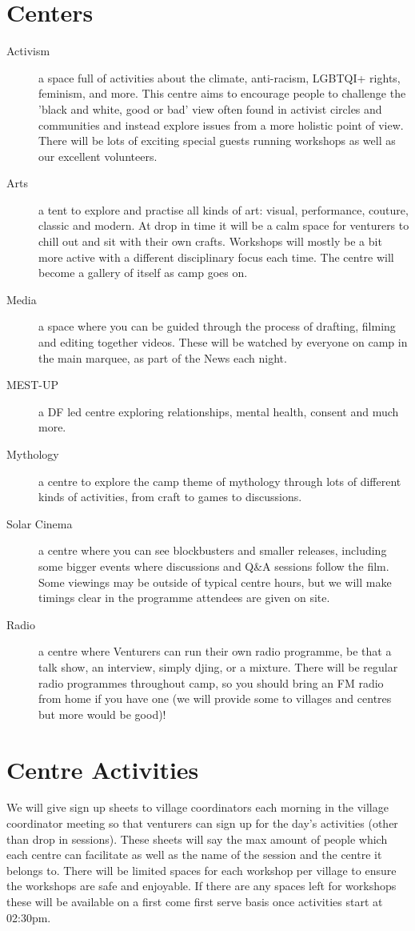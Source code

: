 \documentclass[a4paper, 11pt]{report}
\begin{document}
\section{Centers}
\begin{description}
    \item[Activism] a space full of activities about the climate, anti-racism, LGBTQI+ rights, feminism, and more. This centre aims to encourage people to challenge the 'black and white, good or bad' view often found in activist circles and communities and instead explore issues from a more holistic point of view. There will be lots of exciting special guests running workshops as well as our excellent volunteers.
    \item[Arts] a tent to explore and practise all kinds of art: visual, performance, couture, classic and modern. At drop in time it will be a calm space for venturers to chill out and sit with their own crafts. Workshops will mostly be a bit more active with a different disciplinary focus each time. The centre will become a gallery of itself as camp goes on.
    \item[Media] a space where you can be guided through the process of drafting, filming and editing together videos. These will be watched by everyone on camp in the main marquee, as part of the News each night.
    \item[MEST-UP] a DF led centre exploring relationships, mental health, consent and much more.
    \item[Mythology] a centre to explore the camp theme of mythology through lots of  different kinds of activities, from craft to games to discussions.
    \item[Solar Cinema] a centre where you can see blockbusters and smaller releases, including some bigger events where discussions and Q\&A sessions follow the film. Some viewings may be outside of typical centre hours, but we will make timings clear in the programme attendees are given on site.
    \item[Radio] a centre where Venturers can run their own radio programme, be that a talk show, an interview, simply djing, or a mixture. There will be regular radio programmes throughout camp, so you should bring an FM radio from home if you have one (we will provide some to villages and centres but more would be good)!
\end{description}
\section{Centre Activities}
We will give sign up sheets to village coordinators each morning in the village coordinator meeting so that venturers can sign up for the day's activities (other than drop in sessions). These sheets will say the max amount of people which each centre can facilitate as well as the name of the session and the centre it belongs to. There will be limited spaces for each workshop per village to ensure the workshops are safe and enjoyable. If there are any spaces left for workshops these will be available on a first come first serve basis once activities start at 02:30pm.
\end{document}
